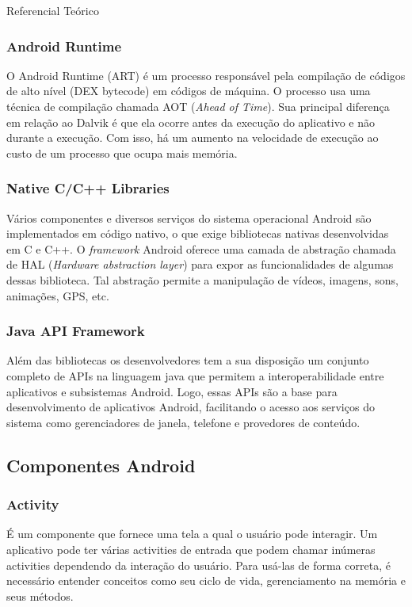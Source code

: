 \documentclass[
	12pt,				%
	openany,			%
	twoside,			%
	a4paper,			%
	english,			%
	french,				%
	spanish,			%
	brazil				%
	]{abntex2}
\begin{document}
\begin{chapter}{Referencial Teórico}
\subsubsection{Android Runtime}
O Android Runtime (ART) é um processo responsável pela compilação de códigos de alto nível (DEX bytecode) em códigos de máquina.
O processo usa uma técnica de compilação chamada AOT (\textit{Ahead of Time}). Sua principal diferença em relação ao Dalvik é que ela ocorre antes 
da execução do aplicativo e não durante a execução. Com isso, há um aumento na velocidade de execução ao custo de um processo que ocupa mais memória.



\subsubsection{Native C/C++ Libraries}
Vários componentes e diversos serviços do sistema operacional Android são implementados em código nativo,
 o que exige bibliotecas nativas desenvolvidas em C e C++.
O \textit{framework} Android oferece uma camada de abstração chamada de HAL (\textit{Hardware abstraction layer}) para expor as funcionalidades de algumas dessas biblioteca.
Tal abstração permite a manipulação de vídeos, imagens, sons, animações, GPS, etc.

\subsubsection{Java API Framework}
Além das bibliotecas os desenvolvedores tem a sua disposição um conjunto completo de APIs na linguagem java que permitem a interoperabilidade entre aplicativos e subsistemas Android. Logo, essas APIs são a base para desenvolvimento de aplicativos Android, facilitando o acesso aos serviços do sistema como gerenciadores de janela, telefone e provedores de conteúdo.

\subsection{Componentes Android}
\subsubsection{Activity}  \label{activity}
É um componente que fornece uma tela a qual o usuário pode interagir. Um aplicativo pode ter várias activities de entrada que podem chamar inúmeras activities dependendo da interação do usuário. Para usá-las de forma correta, é necessário entender conceitos como seu ciclo de vida, gerenciamento na memória e seus métodos. 


\end{chapter}
\end{document}
